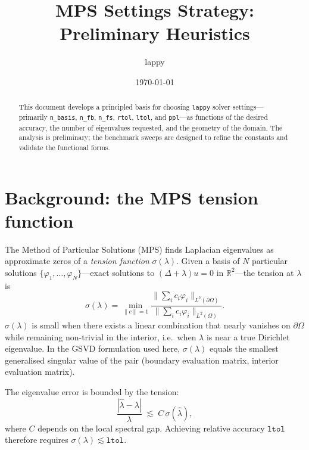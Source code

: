 \documentclass[11pt]{article}
\title{MPS Settings Strategy: Preliminary Heuristics}
\author{lappy}
\date{\today}
\newcommand{\ltol}{\texttt{ltol}}
\begin{document}
\maketitle

\begin{abstract}
This document develops a principled basis for choosing \texttt{lappy} solver
settings---primarily \texttt{n\_basis}, \texttt{n\_fb}, \texttt{n\_fs},
\texttt{rtol}, \texttt{ltol}, and \texttt{ppl}---as functions of the desired
accuracy, the number of eigenvalues requested, and the geometry of the domain.
The analysis is preliminary; the benchmark sweeps are designed to refine the
constants and validate the functional forms.
\end{abstract}

\tableofcontents
\bigskip

\section{Background: the MPS tension function}

The Method of Particular Solutions (MPS) finds Laplacian eigenvalues as
approximate zeros of a \emph{tension function} $\sigma(\lambda)$.  Given a
basis of $N$ particular solutions $\{\varphi_1,\ldots,\varphi_N\}$---exact
solutions to $(\Delta+\lambda)u=0$ in $\mathbb{R}^2$---the tension at $\lambda$
is
\begin{equation}\label{eq:tension}
  \sigma(\lambda)
  =
  \min_{\|c\|=1}
  \frac{\bigl\|\sum_i c_i\varphi_i\bigr\|_{L^2(\partial\Omega)}}
       {\bigl\|\sum_i c_i\varphi_i\bigr\|_{L^2(\Omega)}}.
\end{equation}
$\sigma(\lambda)$ is small when there exists a linear combination that nearly
vanishes on $\partial\Omega$ while remaining non-trivial in the interior,
i.e.\ when $\lambda$ is near a true Dirichlet eigenvalue.  In the GSVD
formulation used here, $\sigma(\lambda)$ equals the smallest generalised
singular value of the pair (boundary evaluation matrix, interior evaluation
matrix).

The eigenvalue error is bounded by the tension:
\begin{equation}\label{eq:error_bound}
  \frac{|\hat\lambda - \lambda|}{\lambda}
  \;\lesssim\;
  C\,\sigma(\hat\lambda),
\end{equation}
where $C$ depends on the local spectral gap.  Achieving relative accuracy
$\ltol$ therefore requires $\sigma(\lambda)\lesssim\ltol$.
\end{document}
